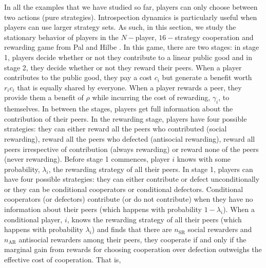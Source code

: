 \documentclass[11pt]{article}
\theoremstyle{plainCl1}
\theoremstyle{plainCl2}
\begin{document}
In all the examples that we have studied so far, players can only choose between two actions (pure strategies). Introspection dynamics is particularly useful when players can use larger strategy sets. As such, in this section, we study the stationary behavior of players in the $N-$player, $16-$strategy cooperation and rewarding game from Pal and Hilbe \cite{Pal:NatCom:2022}. In this game, there are two stages: in stage 1, players decide whether or not they contribute to a linear public good and in stage 2, they decide whether or not they reward their peers. When a player contributes to the public good, they pay a cost $c_i$ but generate a benefit worth $r_i c_i$ that is equally shared by everyone. When a player rewards a peer, they provide them a benefit of $\rho$ while incurring the cost of rewarding, $\gamma_i$, to themselves. In between the stages, players get full information about the contribution of their peers. In the rewarding stage, players have four possible strategies: they can either reward all the peers who contributed (social rewarding), reward all the peers who defected (antisocial rewarding), reward all peers irrespective of contribution (always rewarding) or reward none of the peers (never rewarding). Before stage 1 commences, player $i$ knows with some probability, $\lambda_i$, the rewarding strategy of all their peers. In stage 1, players can have four possible strategies: they can either contribute or defect unconditionally or they can be conditional cooperators or conditional defectors. Conditional cooperators (or defectors) contribute (or do not contribute) when they have no information about their peers (which happens with probability $1 - \lambda_i$). When a conditional player, $i$, knows the rewarding strategy of all their peers (which happens with probability $\lambda_i$) and finds that there are $n_{\mathrm{SR}}$ social rewarders and $n_{\mathrm{AR}}$ antisocial rewarders among their peers, they cooperate if and only if the marginal gain from rewards for choosing cooperation over defection outweighs the effective cost of cooperation. That is, 
\end{document}
